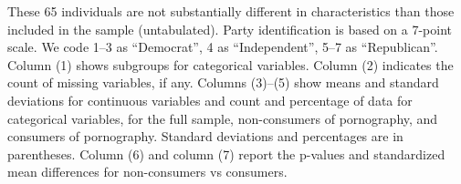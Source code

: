 \documentclass[12pt, letterpaper]{article}
\begin{document}
\begin{table}[ht]
{		These 65 individuals are not substantially different in characteristics than those included in the sample (untabulated).
		Party identification is based on a 7-point scale. We code 1--3 as ``Democrat'', 4 as ``Independent'', 5--7 as ``Republican''.
		Column (1) shows subgroups for categorical variables.
		Column (2) indicates the count of missing variables, if any.
		Columns (3)--(5) show means and standard deviations for continuous variables and count and percentage of data for categorical variables, for the full sample, non-consumers of pornography, and consumers of pornography.
		Standard deviations and percentages are in parentheses.
		Column (6) and column (7) report the p-values and standardized mean differences for non-consumers vs consumers.
	}
\end{table}


\end{document}
